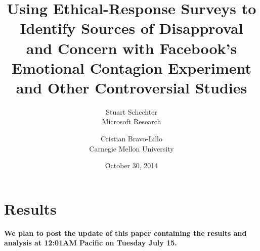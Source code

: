 \documentclass[letterpaper,twocolumn,10pt]{article}
\begin{document}

\date{October 30, 2014}

\title{\Large
Using Ethical-Response Surveys to Identify Sources of Disapproval\\
and Concern with Facebook's Emotional Contagion Experiment\\
and Other Controversial Studies}
\author{
{\rm Stuart Schechter}\\
\normalsize Microsoft Research
\and
{\rm Cristian Bravo-Lillo}\\
\normalsize Carnegie Mellon University
}





\twocolumn[
  \maketitle
  \begin{onecolabstract}

\vspace{.25in}
  \end{onecolabstract}
]
%
%
%
%
\pagebreak


\preview{


}
{
\section{Results}
\textbf{We plan to post the update of this paper containing the results and analysis at 12:01AM Pacific on Tuesday July 15.}

}
%
%
\balance


\clearpage\appendix
%

%
\end{document}
